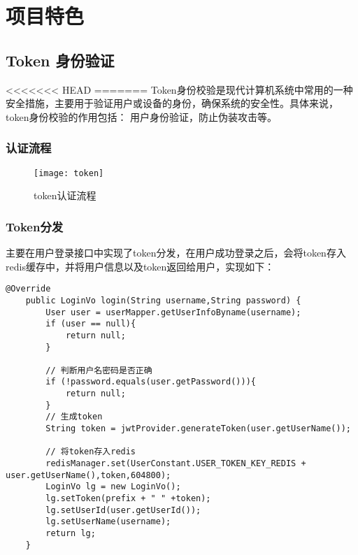 \chapter{项目特色}

\section{Token 身份验证}
<<<<<<< HEAD
=======
Token身份校验是现代计算机系统中常用的一种安全措施，主要用于验证用户或设备的身份，确保系统的安全性。具体来说，token身份校验的作用包括：
用户身份验证，防止伪装攻击等。

\subsection{认证流程}
\begin{figure}[htbp]
	\centering
	\texttt{[image: token]}
	\caption{token认证流程}\label{fig:token}
\end{figure} 

\subsection{Token分发}
主要在用户登录接口中实现了token分发，在用户成功登录之后，会将token存入redis缓存中，并将用户信息以及token返回给用户，实现如下：

\begin{lstlisting}[basicstyle=\footnotesize]
	@Override
	public LoginVo login(String username,String password) {
		User user = userMapper.getUserInfoByname(username);
		if (user == null){
			return null;
		}
		
		// 判断用户名密码是否正确
		if (!password.equals(user.getPassword())){
			return null;
		}
		// 生成token
		String token = jwtProvider.generateToken(user.getUserName());
		
		// 将token存入redis
		redisManager.set(UserConstant.USER_TOKEN_KEY_REDIS + user.getUserName(),token,604800);
		LoginVo lg = new LoginVo();
		lg.setToken(prefix + " " +token);
		lg.setUserId(user.getUserId());
		lg.setUserName(username);
		return lg;
	}
\end{lstlisting}

